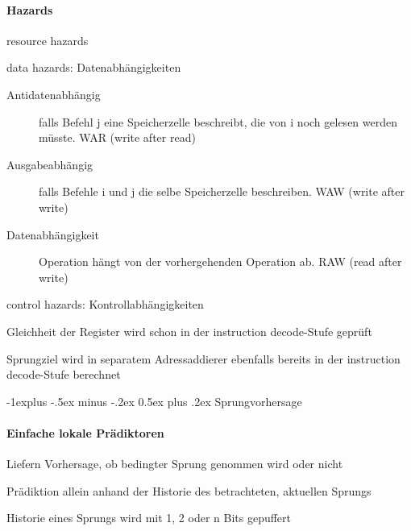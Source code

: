 \documentclass[10pt,landscape]{article}
\makeatletter
\renewcommand{\subsection}{\@startsection{subsection}{2}{0mm}%
                                {-1explus -.5ex minus -.2ex}%
                                {0.5ex plus .2ex}%
                                {\normalfont\normalsize\bfseries}}
\makeatother
\begin{document}
\begin{multicols}{3}
  \paragraph*{Hazards}
  \begin{itemize*}
    \item resource hazards
    \item data hazards: Datenabhängigkeiten
    \begin{description}
      \item[Antidatenabhängig] falls Befehl j eine Speicherzelle beschreibt, die von i noch gelesen werden müsste. WAR (write after read)
      \item[Ausgabeabhängig] falls Befehle i und j die selbe Speicherzelle beschreiben. WAW (write after write)
      \item[Datenabhängigkeit] Operation hängt von der vorhergehenden Operation ab. RAW (read after write)
    \end{description}
    \item control hazards: Kontrollabhängigkeiten
    \begin{itemize*}
      \item Gleichheit der Register wird schon in der instruction decode-Stufe geprüft
      \item Sprungziel wird in separatem Adressaddierer ebenfalls bereits in der instruction decode-Stufe berechnet
    \end{itemize*}
  \end{itemize*}
  
  \subsection{ Sprungvorhersage}
  \paragraph{Einfache lokale Prädiktoren}
  \begin{itemize*}
    \item Liefern Vorhersage, ob bedingter Sprung genommen wird oder nicht
    \item Prädiktion allein anhand der Historie des betrachteten, aktuellen Sprungs
    \item Historie eines Sprungs wird mit 1, 2 oder n Bits gepuffert
  \end{itemize*}
  

\end{multicols}
\end{document}
